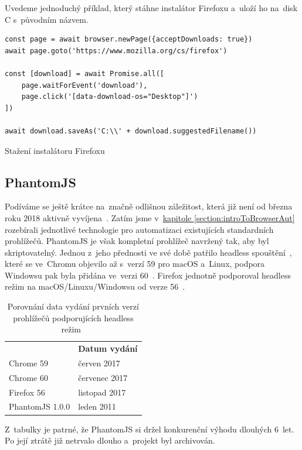 \documentclass[12pt, a4paper, twoside]{article}
\newcommand{\codefigureSpacing}{1.2}
\newcommand{\refAddedText}[3]{\hyperref[#1]{#2\ref{#1}#3}}
\begin{document}
	Uvedeme jednoduchý příklad, který stáhne instalátor Firefoxu a~uloží ho na~disk C s~původním názvem.
	\begin{codefigure}[H]
	\renewcommand\baselinestretch{\codefigureSpacing}
	\begin{lstlisting}[style=MyJavaScript]
const page = await browser.newPage({acceptDownloads: true})
await page.goto('https://www.mozilla.org/cs/firefox')

const [download] = await Promise.all([
	page.waitForEvent('download'),
	page.click('[data-download-os="Desktop"]')
])

await download.saveAs('C:\\' + download.suggestedFilename())
	\end{lstlisting}
	\caption{Stažení instalátoru Firefoxu}
\end{codefigure}
	\newpage
	\subsection{PhantomJS}
	Podíváme se ještě krátce na~značně odlišnou záležitost, která již není od března roku 2018 aktivně vyvíjena~\cite{phantomJsArchiving}. Zatím jsme v~\refAddedText{section:introToBrowserAut}{kapitole }{} rozebírali jednotlivé technologie pro automatizaci existujících standardních prohlížečů. PhantomJS je však kompletní prohlížeč navržený tak, aby byl skriptovatelný. Jednou z~jeho přednosti ve své době patřilo headless spouštění~\cite{phantomJsMainPage}, které se ve~Chromu objevilo až s~verzí 59 pro macOS a~Linux, podpora Windowsu pak byla přidána ve~verzi 60~\cite{headlessChromeGettingStarted}. Firefox jednotně podporoval headless režim na macOS/Linuxu/Windowsu od verze 56~\cite{headlessFirefox}.
	
	\begin{table}[H]
		\centering
		\begin{tabular}{ l|l } 
			\rowcolor{tableHeadingBackground}
			\multicolumn{1}{l}{\textbf{Prohlížeče}} & \multicolumn{1}{l}{\textbf{Datum vydání}} \\
			Chrome 59 & červen 2017 \\ 
			Chrome 60 & červenec 2017 \\
			Firefox 56 & listopad 2017 \\
			PhantomJS 1.0.0 & leden 2011
		\end{tabular}
		\captionsetup{justification=centering}
		\caption{Porovnání data vydání prvních verzí prohlížečů podporujících \mbox{head\-less} režim~\cite{googleChromeReleases, firefoxReleaseCalendar, phantomJsFirstRelease}}
	\end{table}
	Z~tabulky je patrné, že PhantomJS si držel konkurenční výhodu dlouhých 6~let. Po její ztrátě již netrvalo dlouho a~projekt byl archivován.
	
\end{document}
